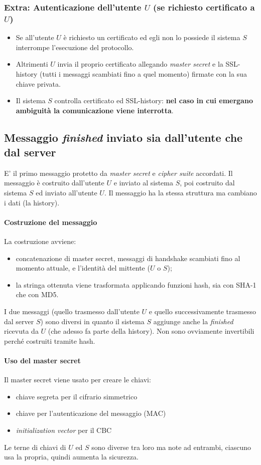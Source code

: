 \subsubsection{Extra: Autenticazione dell'utente $U$ (se richiesto certificato a $U$)}
\begin{itemize}
	\item Se all'utente $U$ è richiesto un certificato ed egli non lo possiede il sistema $S$ interrompe l'esecuzione del protocollo.
	\item Altrimenti $U$ invia il proprio certificato allegando \emph{master secret} e la SSL-history (tutti i messaggi scambiati fino a quel momento) firmate con la sua chiave privata.
	\item Il sistema $S$ controlla certificato ed SSL-history: \textbf{nel caso in cui emergano ambiguità la comunicazione viene interrotta}.
\end{itemize}


\subsection{Messaggio \emph{finished} inviato sia dall'utente che dal server}
E' il primo messaggio protetto da \emph{master secret} e \emph{cipher suite} accordati. Il messaggio è costruito dall'utente $U$ e inviato al sistema $S$, poi costruito dal sistema $S$ ed inviato all'utente $U$. Il messaggio ha la stessa struttura ma cambiano i dati (la history).
\paragraph{Costruzione del messaggio} La costruzione avviene:
\begin{itemize}
    \item concatenazione di master secret, messaggi di handshake scambiati fino al momento attuale, e l'identità del mittente ($U$ o $S$);
    \item la stringa ottenuta viene trasformata applicando funzioni hash, sia con SHA-1 che con MD5. 
\end{itemize}
I due messaggi (quello trasmesso dall'utente $U$ e quello successivamente trasmesso dal server $S$) sono diversi in quanto il sistema $S$ aggiunge anche la \emph{finished} ricevuta da $U$ (che adesso fa parte della history). Non sono ovviamente invertibili perché costruiti tramite hash.
\paragraph{Uso del master secret} Il master secret viene usato per creare le chiavi:
\begin{itemize}
    \item chiave segreta per il cifrario simmetrico
    \item chiave per l'autenticazione del messaggio (MAC)
    \item \textit{initialization vector} per il CBC
\end{itemize}
Le terne di chiavi di $U$ ed $S$ sono diverse tra loro ma note ad entrambi, ciascuno usa la propria, quindi aumenta la sicurezza.

